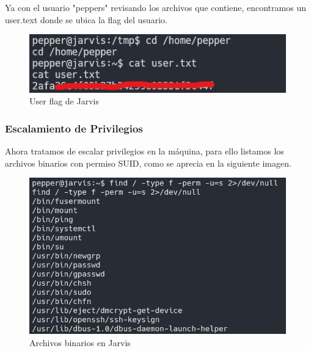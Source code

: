         \large{Ya con el usuario "peppers" revisando los archivos que contiene, encontramos un user.text donde se ubica la flag del usuario.}
        \par
        \begin{figure}[H]
            \centering
            \includegraphics[width=0.99\textwidth]{imagenes/jarvis/19_user_flag_jarvis.jpg}
            \caption{User flag de Jarvis}
        \end{figure}

    \subsubsection{Escalamiento de Privilegios}

        \large{Ahora tratamos de escalar privilegios en la máquina, para ello listamos los archivos binarios con permiso SUID, como se aprecia en la siguiente imagen.}
        \par
        \begin{figure}[H]
            \centering
            \includegraphics[width=0.99\textwidth]{imagenes/jarvis/20_binarios_suid_jarvis.png}
            \caption{Archivos binarios en Jarvis}
        \end{figure}

